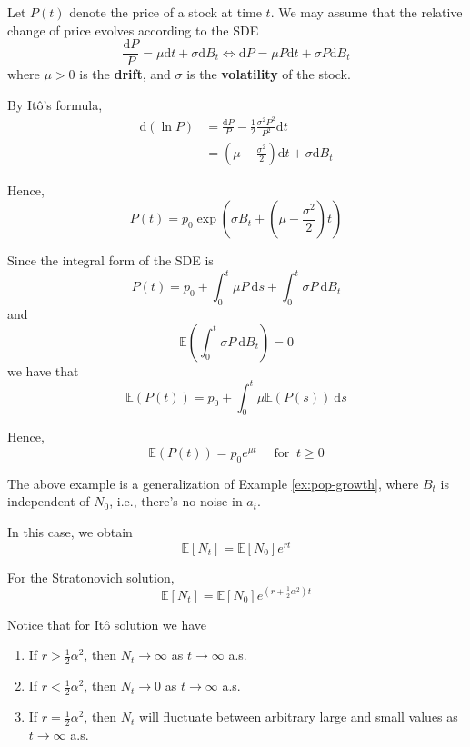 \begin{example}\label{ex:stock_prices}
    Let $P(t)$ denote the price of a stock at time $t$. We may assume that the relative change of price evolves according to the SDE 
    \[
        \frac{\mathrm{d} P}{P} = \mu \mathrm{d}t + \sigma \mathrm{d} B_t \iff \mathrm{d} P = \mu P \mathrm{d}t + \sigma P \mathrm{d} B_t
    \]
    where $\mu > 0$ is the \textbf{drift}, and $\sigma$ is the \textbf{volatility} of the stock. 

    By Itô's formula,
    \begin{equation*}
        \begin{aligned}
            \mathrm{d}(\ln P) &= \frac{\mathrm{d} P}{P} - \frac{1}{2} \frac{\sigma^2 P^2}{P^2} \mathrm{d}t \\
            &= \left( \mu - \frac{\sigma^2}{2} \right) \mathrm{d}t + \sigma \mathrm{d} B_t
        \end{aligned}
    \end{equation*}

    Hence,
    \[
        P(t) = p_0 \exp \left( \sigma B_t + \left( \mu - \frac{\sigma^2}{2} \right) t \right)
    \]

    Since the integral form of the SDE is 
    \[
        P(t) = p_0 + \int_0^t \mu P~\mathrm{d}s + \int_0^t \sigma P~\mathrm{d}B_t
    \]
    and 
    \[
        \mathbb{E} \left( \int_0^t \sigma P ~\mathrm{d}B_t \right) = 0  
    \]
    we have that
    \[
        \mathbb{E}(P(t)) = p_0 + \int_0^t \mu \mathbb{E}(P(s))~\mathrm{d}s
    \]

    Hence, 
    \[
        \mathbb{E}(P(t)) = p_0 e^{\mu t} \quad \text{ for } ~ t \geq 0
    \]
\end{example}

The above example is a generalization of Example \ref{ex:pop-growth}, where $B_t$ is independent of $N_0$, i.e., there's no noise in $a_t$. 

In this case, we obtain
\[
    \mathbb{E}[N_t] = \mathbb{E}[N_0] e^{rt}
\]

For the Stratonovich solution,
\[
    \mathbb{E}[N_t] = \mathbb{E}[N_0] e^{\left( r+\frac{1}{2} \alpha^2 \right) t}
\]

Notice that for Itô solution we have 
\begin{enumerate}
    \item If $r > \frac{1}{2} \alpha^2$, then $N_t \to \infty$ as $t \to \infty$ a.s.
    \item If $r < \frac{1}{2} \alpha^2$, then $N_t \to 0$ as $t \to \infty$ a.s.
    \item If $r = \frac{1}{2} \alpha^2$, then $N_t$ will fluctuate between arbitrary large and small values as $t \to \infty$ a.s.
\end{enumerate}

